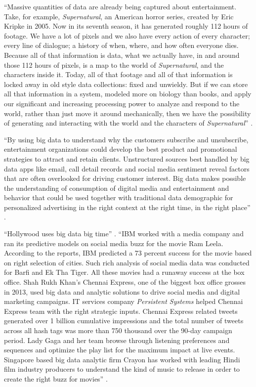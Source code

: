\documentclass[sigconf]{acmart}
\begin{document}
``Massive quantities of data are already being captured about entertainment. Take, for example, {\em Supernatural}, an American horror series, created by Eric Kripke in 2005. Now in its seventh season, it has generated roughly 112 hours of footage. We have a lot of pixels and we also have every action of every character; every line of dialogue; a history of when, where, and how often everyone dies. Because all of that information is data, what we actually have, in and around those 112 hours of pixels, is a map to the world of {\em Supernatural}, and the characters inside it. Today, all of that footage and all of that information is locked away in old style data collections: fixed and unwieldy. But if we can store all that information in a system, modeled more on biology than books, and apply our significant and increasing processing power to analyze and respond to the world, rather than just move it around mechanically, then we have the possibility of generating and interacting with the world and the characters of {\em Supernatural}'' \cite{Schlieski2012data}.

``By using big data to understand why the customers subscribe and unsubscribe, entertainment organizations could develop the best product and promotional strategies to attract and retain clients. Unstructured sources best handled by big data apps like email, call detail records and social media sentiment reveal factors that are often overlooked for driving customer interest. Big data makes possible the understanding of consumption of digital media and entertainment and behavior that could be used together with traditional data demographic for personalized advertising in the right context at the right time, in the right place'' \cite{Mehta2017entertainment}. 

``Hollywood uses big data big time'' \cite{Mehta2017entertainment}. ``IBM worked with a media company and ran its predictive models on social media buzz for the movie Ram Leela. According to the reports, IBM predicted a 73 percent success for the movie based on right selection of cities. Such rich analysis of social media data was conducted for Barfi and Ek Tha Tiger. All these movies had a runaway success at the box office. Shah Rukh Khan's Chennai Express, one of the biggest box office grosses in 2013, used big data and analytic solutions to drive social media and digital marketing campaigns. IT services company {\em Persistent Systems} helped Chennai Express team with the right strategic inputs. Chennai Express related tweets generated over 1 billion cumulative impressions and the total number of tweets across all hash tags was more than 750 thousand over the 90-day campaign period. Lady Gaga and her team browse through listening preferences and sequences and optimize the play list for the maximum impact at live events. Singapore based big data analytic firm Crayon has worked with leading Hindi film industry producers to understand the kind of music to release in order to create the right buzz for movies'' \cite{Karania2014industry}.
\end{document}
